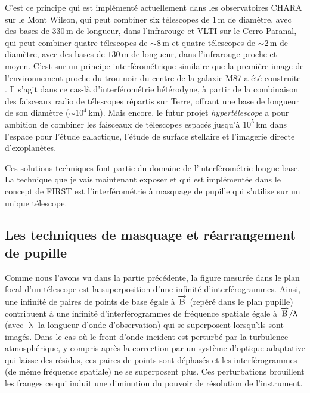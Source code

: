 C'est ce principe qui est implémenté actuellement dans les observatoires \ac{CHARA} \citep{tenbrummelaar2005} sur le Mont Wilson, qui peut combiner six télescopes de $1 \,$m de diamètre, avec des bases de $330 \,$m de longueur, dans l'infrarouge et \ac{VLTI} \citep{haguenauer2012} sur le Cerro Paranal, qui peut combiner quatre télescopes de $\sim 8 \,$m et quatre télescopes de $\sim 2 \,$m de diamètre, avec des bases de $130 \,$m de longueur, dans l'infrarouge proche et moyen. C'est sur un principe interférométrique similaire que la première image de l'environnement proche du trou noir du centre de la galaxie M87 a été construite \citep{EHTC2019}. Il s'agit dans ce cas-là d'interférométrie hétérodyne, à partir de la combinaison des faisceaux radio de télescopes répartis sur Terre, offrant une base de longueur de son diamètre ($\sim 10^4 \,$km). Mais encore, le futur projet \textit{hypertélescope} \citep{labeyrie2013} a pour ambition de combiner les faisceaux de télescopes espacés jusqu'à $10^5 \,$km dans l'espace pour l'étude galactique, l'étude de surface stellaire et l'imagerie directe d'exoplanètes.

Ces solutions techniques font partie du domaine de l'interférométrie longue base. La technique que je vais maintenant exposer et qui est implémentée dans le concept de \ac{FIRST} est l'interférométrie à masquage de pupille qui s'utilise sur un unique télescope.


\subsection{Les techniques de masquage et réarrangement de pupille}
\label{sec:PupilMasking}

Comme nous l'avons vu dans la partie précédente, la figure mesurée dans le plan focal d'un télescope est la superposition d'une infinité d'interférogrammes. Ainsi, une infinité de paires de points de base égale à $\overrightarrow{\text{B}}$ (repéré dans le plan pupille) contribuent à une infinité d'interférogrammes de fréquence spatiale égale à $\overrightarrow{\text{B}} / \uplambda$ (avec $\uplambda$ la longueur d'onde d'observation) qui se superposent lorsqu'ils sont imagés. Dans le cas où le front d'onde incident est perturbé par la turbulence atmosphérique, y compris après la correction par un système d'optique adaptative qui laisse des résidus, ces paires de points sont déphasés et les interférogrammes (de même fréquence spatiale) ne se superposent plus. Ces perturbations brouillent les franges ce qui induit une diminution du pouvoir de résolution de l'instrument. 

